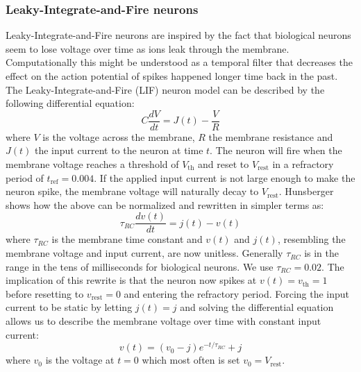 \documentclass[a4paper,11pt]{article}
\begin{document}
\subsubsection{Leaky-Integrate-and-Fire neurons}
Leaky-Integrate-and-Fire neurons are inspired by the fact that biological neurons seem to lose voltage over time as ions leak through the membrane. Computationally this might be understood as a temporal filter that decreases the effect on the action potential of spikes happened longer time back in the past. The Leaky-Integrate-and-Fire (LIF) neuron model can be described by the following differential equation:
\begin{equation}
  C \frac{d V}{dt}=J(t)-\frac{V}{R}
\end{equation}
where $V$ is the voltage across the membrane, $R$ the membrane resistance and $J(t)$ the input current to the neuron at time $t$. The neuron will fire when the membrane voltage reaches a threshold of $V_\text{th}$ and reset to $V_\text{rest}$ in a refractory period of $t_\text{ref} = 0.004$. If the applied input current is not large enough to make the neuron spike, the membrane voltage will naturally decay to $V_\text{rest}$. Hunsberger \cite{Eric2018} shows how the above can be normalized and rewritten in simpler terms as:
\begin{equation}
  \tau_{RC} \frac{dv(t)}{dt} = j(t) - v(t) 
\end{equation}
where $\tau_{RC}$ is the membrane time constant and $v(t)$ and $j(t)$, resembling the membrane voltage and input current, are now unitless. Generally $\tau_{RC}$ is in the range in the tens of milliseconds for biological neurons. We use $\tau_{RC}=0.02$. The implication of this rewrite is that the neuron now spikes at $v(t) = v_\text{th} = 1$ before resetting to $v_\text{rest} = 0$ and entering the refractory period. Forcing the input current to be static by letting $j(t) = j$ and solving the differential equation allows us to describe the membrane voltage over time with constant input current:
\begin{equation}
  v(t) = (v_0 - j) e^{-t/\tau_{RC}} + j
\end{equation}
where $v_0$ is the voltage at $t=0$ which most often is set $v_0 = V_\text{rest}$. %
\end{document}
